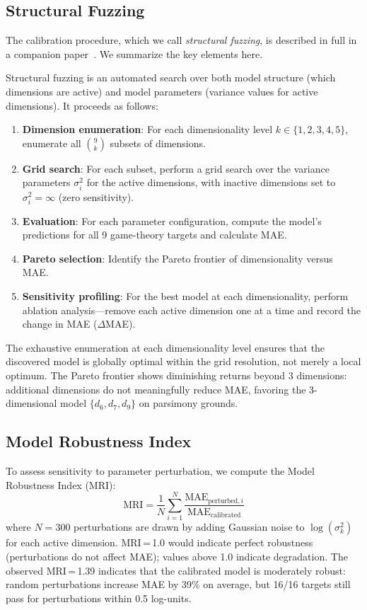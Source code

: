 \documentclass[journal]{IEEEtran}
\begin{document}
\subsection{Structural Fuzzing}

The calibration procedure, which we call \emph{structural fuzzing}, is described in full in a companion paper~\cite{bond2026fuzz}.
We summarize the key elements here.

Structural fuzzing is an automated search over both model structure (which dimensions are active) and model parameters (variance values for active dimensions).
It proceeds as follows:
\begin{enumerate}
    \item \textbf{Dimension enumeration}: For each dimensionality level $k \in \{1, 2, 3, 4, 5\}$, enumerate all $\binom{9}{k}$ subsets of dimensions.
    \item \textbf{Grid search}: For each subset, perform a grid search over the variance parameters $\sigma_i^2$ for the active dimensions, with inactive dimensions set to $\sigma_i^2 = \infty$ (zero sensitivity).
    \item \textbf{Evaluation}: For each parameter configuration, compute the model's predictions for all 9 game-theory targets and calculate MAE.
    \item \textbf{Pareto selection}: Identify the Pareto frontier of dimensionality versus MAE.
    \item \textbf{Sensitivity profiling}: For the best model at each dimensionality, perform ablation analysis---remove each active dimension one at a time and record the change in MAE ($\Delta$MAE).
\end{enumerate}

The exhaustive enumeration at each dimensionality level ensures that the discovered model is globally optimal within the grid resolution, not merely a local optimum.
The Pareto frontier shows diminishing returns beyond 3 dimensions: additional dimensions do not meaningfully reduce MAE, favoring the 3-dimensional model $\{d_6, d_7, d_9\}$ on parsimony grounds.

\subsection{Model Robustness Index}

To assess sensitivity to parameter perturbation, we compute the Model Robustness Index (MRI):
\begin{equation}
    \text{MRI} = \frac{1}{N} \sum_{i=1}^{N} \frac{\text{MAE}_{\text{perturbed},i}}{\text{MAE}_{\text{calibrated}}}
    \label{eq:mri}
\end{equation}
where $N = 300$ perturbations are drawn by adding Gaussian noise to $\log(\sigma_k^2)$ for each active dimension.
MRI\,=\,1.0 would indicate perfect robustness (perturbations do not affect MAE); values above 1.0 indicate degradation.
The observed MRI\,=\,1.39 indicates that the calibrated model is moderately robust: random perturbations increase MAE by 39\% on average, but 16/16 targets still pass for perturbations within 0.5 log-units.
\end{document}
